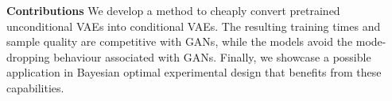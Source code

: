 
\textbf{Contributions} We develop a method to cheaply convert pretrained
unconditional VAEs into conditional VAEs. The resulting training times and
sample quality are competitive with GANs, while the models avoid the
mode-dropping behaviour associated with GANs. Finally, we showcase a possible
application in Bayesian optimal experimental design that benefits from these
capabilities.

